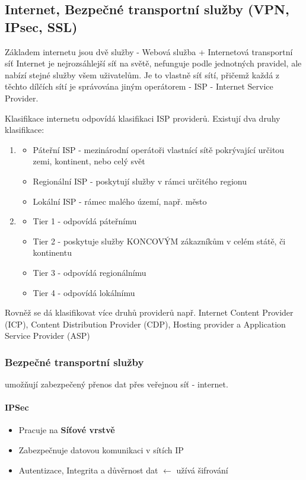 \documentclass[10pt,a4paper]{article}
\begin{document}
\subsection{Internet, Bezpečné transportní služby (VPN, IPsec, SSL)}
Základem internetu jsou dvě služby - Webová služba + Internetová transportní síť
Internet je nejrozsáhlejší síť na světě, nefunguje podle jednotných pravidel, ale nabízí stejné služby všem uživatelům. Je to vlastně síť sítí, přičemž každá z těchto dílčích sítí je správována jiným operátorem - ISP - Internet Service Provider.

Klasifikace internetu odpovídá klasifikaci ISP providerů. Existují dva druhy klasifikace:

\begin{enumerate}
\item
\begin{itemize}
\item Páteřní ISP - mezinárodní operátoři vlastnící sítě pokrývající určitou zemi, kontinent, nebo celý svět
\item Regionální ISP - poskytují služby v rámci určitého regionu
\item Lokální ISP - rámec malého území, např. město
\end{itemize}
\item 
\begin{itemize}
\item Tier 1 - odpovídá páteřnímu
\item Tier 2 - poskytuje služby KONCOVÝM zákazníkům v celém státě, či kontinentu
\item Tier 3 - odpovídá regionálnímu
\item Tier 4 - odpovídá lokálnímu
\end{itemize}
\end{enumerate}

Rovněž se dá klasifikovat více druhů providerů např. Internet Content Provider (ICP), Content Distribution Provider (CDP), Hosting provider a Application Service Provider (ASP)
\subsubsection{Bezpečné transportní služby}
umožňují zabezpečený přenos dat přes veřejnou síť - internet.
\paragraph{IPSec}

\begin{itemize}
\item Pracuje na \textbf{Síťové vrstvě}
\item Zabezpečnuje datovou komunikaci v sítích IP
\item Autentizace, Integrita a důvěrnost dat $\leftarrow$ užívá šifrování
\end{itemize}
\end{document}

